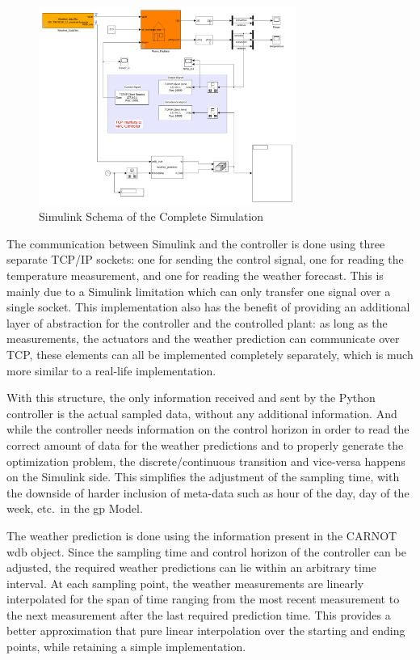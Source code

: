 \begin{figure}[ht]
    \centering
    \includegraphics[width = 0.75\textwidth]{Images/polydome_python.pdf}
    \caption{Simulink Schema of the Complete Simulation}
    \label{fig:Simulink_complete}
\end{figure}

The communication between Simulink and the controller is done using three
separate TCP/IP sockets: one for sending the control signal, one for reading the
temperature measurement, and one for reading the weather forecast. This is
mainly due to a Simulink limitation which can only transfer one signal over a
single socket. This implementation also has the benefit of providing an
additional layer of abstraction for the controller and the controlled plant: as
long as the measurements, the actuators and the weather prediction can
communicate over TCP, these elements can all be implemented completely
separately, which is much more similar to a real-life implementation.

With this structure, the only information received and sent by the Python
controller is the actual sampled data, without any additional information. And
while the controller needs information on the control horizon in order to read
the correct amount of data for the weather predictions and to properly generate
the optimization problem, the discrete/continuous transition and vice-versa
happens on the Simulink side. This simplifies the adjustment of the sampling
time, with the downside of harder inclusion of meta-data such as hour of the
day, day of the week, etc.\ in the \acrlong{gp} Model.

The weather prediction is done using the information present in the CARNOT
\acrshort{wdb} object. Since the sampling time and control horizon of the
controller can be adjusted, the required weather predictions can lie within an
arbitrary time interval. At each sampling point, the weather measurements are
linearly interpolated for the span of time ranging from the most recent
measurement to the next measurement after the last required prediction time.
This provides a better approximation that pure linear interpolation over the
starting and ending points, while retaining a simple implementation.

